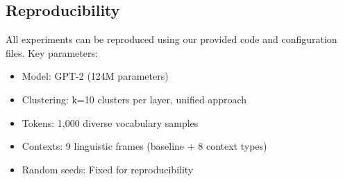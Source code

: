 \documentclass[11pt,a4paper]{article}
\begin{document}
\subsection{Reproducibility}
All experiments can be reproduced using our provided code and configuration files. Key parameters:
\begin{itemize}
    \item Model: GPT-2 (124M parameters)
    \item Clustering: k=10 clusters per layer, unified approach
    \item Tokens: 1,000 diverse vocabulary samples
    \item Contexts: 9 linguistic frames (baseline + 8 context types)
    \item Random seeds: Fixed for reproducibility
\end{itemize}
\end{document}
